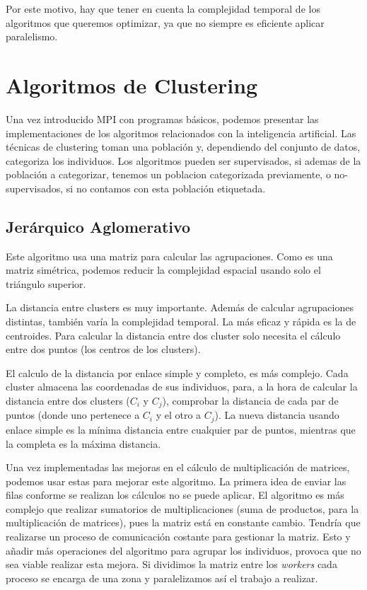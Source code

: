 	Por este motivo, hay que tener en cuenta la complejidad temporal de los algoritmos que queremos optimizar, ya que no siempre es eficiente aplicar paralelismo.

	\newpage 

\section{Algoritmos de Clustering}

	Una vez introducido MPI con programas básicos, podemos presentar las implementaciones de los algoritmos relacionados con la inteligencia artificial. Las técnicas de clustering toman una población y, dependiendo del conjunto de datos, categoriza los individuos. Los algoritmos pueden ser supervisados, si ademas de la población a categorizar, tenemos un poblacion categorizada previamente, o no-supervisados, si no contamos con esta población etiquetada.

	\subsection{Jerárquico Aglomerativo}
		Este algoritmo usa una matriz para calcular las agrupaciones. Como es una matriz simétrica, podemos reducir la complejidad espacial usando solo el triángulo superior. 
		
		La distancia entre clusters es muy importante. Además de calcular agrupaciones distintas, también varía la complejidad temporal. La más eficaz y rápida es la de centroides. Para calcular la distancia entre dos cluster solo necesita el cálculo entre dos puntos (los centros de los clusters). 
		
		El calculo de la distancia por enlace simple y completo, es más complejo. Cada cluster almacena las coordenadas de sus individuos, para, a la hora de calcular la distancia entre dos clusters (\(C_{i}\) y \(C_{j}\)), comprobar la distancia de cada par de puntos (donde uno pertenece a \(C_{i}\) y el otro a \(C_{j}\)). La nueva distancia usando enlace simple es la mínima distancia entre cualquier par de puntos, mientras que la completa es la máxima distancia.
		
	
		Una vez implementadas las mejoras en el cálculo de multiplicación de matrices, podemos usar estas para mejorar este algoritmo. La primera idea de enviar las filas conforme se realizan los cálculos no se puede aplicar. El algoritmo es más complejo que realizar sumatorios de multiplicaciones (suma de productos, para la multiplicación de matrices), pues la matriz está en constante cambio. Tendría que realizarse un proceso de comunicación costante para gestionar la matriz. Esto y añadir más operaciones del algoritmo para agrupar los individuos, provoca que no sea viable realizar esta mejora. Si dividimos la matriz entre los \textit{workers} cada proceso se encarga de una zona y paralelizamos así el trabajo a realizar.
		
